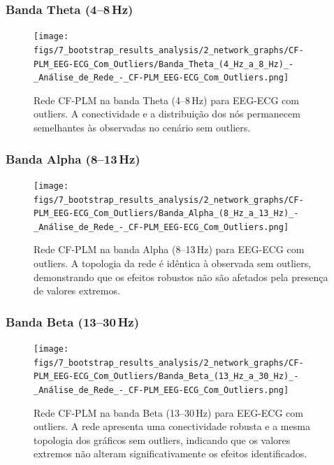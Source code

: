 \subsubsection{\texorpdfstring{Banda Theta (4--8\,Hz)}{Banda Theta (4-8 Hz)}}
\begin{figure}[htb]
  \centering
  \texttt{[image: figs/7\_bootstrap\_results\_analysis/2\_network\_graphs/CF-PLM\_EEG-ECG\_Com\_Outliers/Banda\_Theta\_(4\_Hz\_a\_8\_Hz)\_-\_Análise\_de\_Rede\_-\_CF-PLM\_EEG-ECG\_Com\_Outliers.png]}
  \caption{Rede CF-PLM na banda Theta (4--8\,Hz) para EEG-ECG com outliers. A conectividade e a distribuição dos nós permanecem semelhantes às observadas no cenário sem outliers.}
  \label{fig:rede_cfplm_theta_com}
\end{figure}

\subsubsection{\texorpdfstring{Banda Alpha (8--13\,Hz)}{Banda Alpha (8-13 Hz)}}
\begin{figure}[htb]
  \centering
  \texttt{[image: figs/7\_bootstrap\_results\_analysis/2\_network\_graphs/CF-PLM\_EEG-ECG\_Com\_Outliers/Banda\_Alpha\_(8\_Hz\_a\_13\_Hz)\_-\_Análise\_de\_Rede\_-\_CF-PLM\_EEG-ECG\_Com\_Outliers.png]}
  \caption{Rede CF-PLM na banda Alpha (8--13\,Hz) para EEG-ECG com outliers. A topologia da rede é idêntica à observada sem outliers, demonstrando que os efeitos robustos não são afetados pela presença de valores extremos.}
  \label{fig:rede_cfplm_alpha_com}
\end{figure}

\subsubsection{\texorpdfstring{Banda Beta (13--30\,Hz)}{Banda Beta (13-30 Hz)}}
\begin{figure}[htb]
  \centering
  \texttt{[image: figs/7\_bootstrap\_results\_analysis/2\_network\_graphs/CF-PLM\_EEG-ECG\_Com\_Outliers/Banda\_Beta\_(13\_Hz\_a\_30\_Hz)\_-\_Análise\_de\_Rede\_-\_CF-PLM\_EEG-ECG\_Com\_Outliers.png]}
  \caption{Rede CF-PLM na banda Beta (13--30\,Hz) para EEG-ECG com outliers. A rede apresenta uma conectividade robusta e a mesma topologia dos gráficos sem outliers, indicando que os valores extremos não alteram significativamente os efeitos identificados.}
  \label{fig:rede_cfplm_beta_com}
\end{figure}

